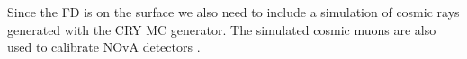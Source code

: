 


Since the \gls{FD} is on the surface we also need to include a simulation of cosmic rays generated with the \gls{CRY} \cite{CRY} \gls{MC} generator. The simulated cosmic muons are also used to calibrate \gls{NOvA} detectors \cite{NuMIFlux.pdf}. 

